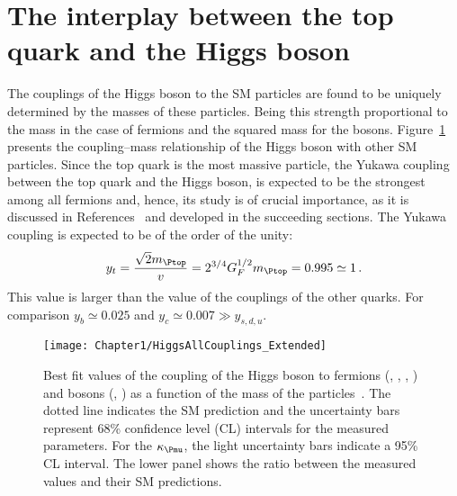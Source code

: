 \section{The interplay between the top quark and the Higgs boson}
\label{sec:Chap1:top-Higgs}

The couplings of the Higgs boson to the SM particles are found to be 
uniquely determined by the masses of these particles. Being this strength proportional
to the mass in the case of fermions and the squared mass for the bosons. 
Figure~\ref{fig:Chap2:HiggsAllCouplings} presents 
the coupling--mass relationship of the Higgs boson with other SM particles.
Since the top quark is the most massive particle, 
the Yukawa coupling between the top quark and the Higgs boson, \yt is expected 
to be the strongest among all fermions and, hence, its
study is of crucial importance, as it is discussed in References~\cite{Farina:2012xp, Biswas:2012bd} 
and developed in the succeeding sections. The Yukawa coupling is expected to be of the order of the unity:
\begin{equation*}
	\yt = \frac{\sqrt{2}\mtop}{v} = 2^{3/4}G_{F}^{1/2}\mtop = 0.995 \simeq 1 \, .
\end{equation*}
This value is larger than the value of the couplings of the other quarks. For comparison
$y_b \simeq 0.025$ and $y_c \simeq 0.007 \gg y_{s,d,u}$. 

\begin{figure}
    \centering
    \texttt{[image: Chapter1/HiggsAllCouplings\_Extended]}
    \caption{Best fit values of the coupling of the Higgs boson to fermions (\Pmu, \Ptau, \Pbottom, \Ptop) 
    		and bosons (\PW, \PZ) as a function of the mass of the particles~\cite{ATLAS-CONF-2021-053, ATLAS-CONF-2015-007}. 
		The dotted line indicates the SM prediction and the uncertainty bars represent
		68\% confidence level (CL) intervals for the measured parameters. For the $\kappa_{\Pmu}$, the
		light uncertainty bars indicate a 95\% CL interval. The lower panel shows the ratio between the measured
		values and their SM predictions.}
    \label{fig:Chap2:HiggsAllCouplings}
\end{figure}



